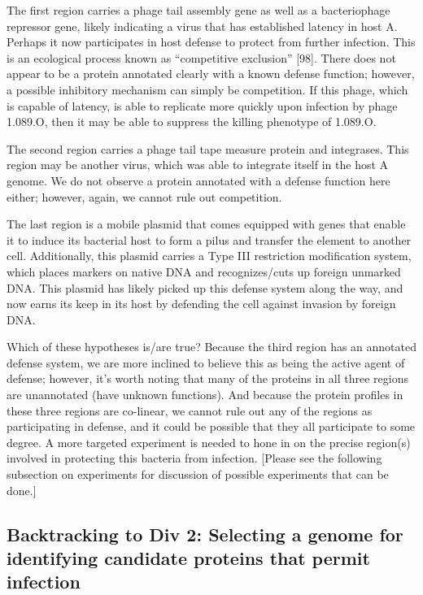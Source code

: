 \documentclass[12pt,twoside]{mitthesis-manusdown}
\begin{document}
The first region carries a phage tail assembly gene as well as a
bacteriophage repressor gene, likely indicating a virus that has
established latency in host A. Perhaps it now participates in host
defense to protect from further infection. This is an ecological process
known as ``competitive exclusion'' {[}98{]}. There does not appear to be
a protein annotated clearly with a known defense function; however, a
possible inhibitory mechanism can simply be competition. If this phage,
which is capable of latency, is able to replicate more quickly upon
infection by phage 1.089.O, then it may be able to suppress the killing
phenotype of 1.089.O.

The second region carries a phage tail tape measure protein and
integrases. This region may be another virus, which was able to
integrate itself in the host A genome. We do not observe a protein
annotated with a defense function here either; however, again, we cannot
rule out competition.

The last region is a mobile plasmid that comes equipped with genes that
enable it to induce its bacterial host to form a pilus and transfer the
element to another cell. Additionally, this plasmid carries a Type III
restriction modification system, which places markers on native DNA and
recognizes/cuts up foreign unmarked DNA. This plasmid has likely picked
up this defense system along the way, and now earns its keep in its host
by defending the cell against invasion by foreign DNA.

Which of these hypotheses is/are true? Because the third region has an
annotated defense system, we are more inclined to believe this as being
the active agent of defense; however, it's worth noting that many of the
proteins in all three regions are unannotated (have unknown functions).
And because the protein profiles in these three regions are co-linear,
we cannot rule out any of the regions as participating in defense, and
it could be possible that they all participate to some degree. A more
targeted experiment is needed to hone in on the precise region(s)
involved in protecting this bacteria from infection. {[}Please see the
following subsection on experiments for discussion of possible
experiments that can be done.{]}

\subsection{Backtracking to Div 2: Selecting a genome for identifying
candidate proteins that permit
infection}\label{backtracking-to-div-2-selecting-a-genome-for-identifying-candidate-proteins-that-permit-infection}
\end{document}
